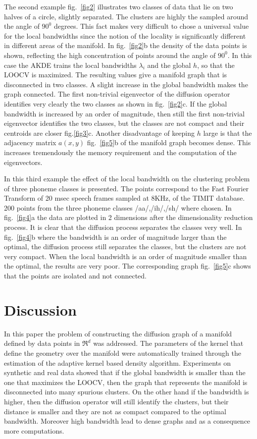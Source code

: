 \documentclass[12pt,letterpaper,doublespaced,ETD,dvips,proposal]{gtthesis}
\begin{document}
\begin{Body}
The second example fig.~\ref{fig2} illustrates two classes of data
that lie on two halves of a circle, slightly separated. The clusters
are highly the sampled around the angle  of $90^0$ degrees. This
fact makes very difficult to chose a universal value for the local
bandwidths since the notion of the locality is significantly
different in different areas of the manifold. In fig.~\ref{fig2}b
the  density of the data points is shown, reflecting the high
concentration of points around the angle of $90^0$. In this case the
AKDE trains the local bandwidths $\lambda_i$ and the global $h$, so
that the LOOCV is maximized. The resulting values give a manifold
graph that is disconnected in two classes. A  slight increase in the
global bandwidth makes the graph connected.  The first non-trivial
eigenvector of the diffusion operator identifies very clearly the
two classes as shown in fig.~\ref{fig2}c. If the global bandwidth is
increased by an order of magnitude, then still the first non-trivial
eigenvector identifies the two classes, but the classes are not
compact and their centroids are closer fig.\ref{fig3}c. Another
disadvantage of keeping $h$ large is that the adjacency matrix
$a(x,y)$ fig.~\ref{fig5}b of the manifold graph becomes dense. This
increases tremendously the memory requirement and the computation of
the eigenvectors.

In this third example the effect of the local bandwidth on the
clustering problem of three phoneme classes is presented. The points
correspond to the Fast Fourier Transform of 20 msec speech frames
sampled at 8KHz, of the TIMIT database. 200 points from the three
phoneme classes /aa/,/ih/,/sh/ where chosen. In fig.~\ref{fig4}a the
data are plotted in 2 dimensions after the dimensionality reduction
process. It is clear that the diffusion process separates the
classes very well. In fig.~\ref{fig4}b where the bandwidth is an
order of magnitude larger than the optimal, the diffusion process
still separates the  classes, but the clusters are not very compact.
When the local bandwidth is an order of magnitude smaller than the
optimal, the results are very poor. The corresponding graph
fig.~\ref{fig5}c shows that the points are isolated and not
connected.




\section{Discussion}
In this paper the problem of constructing the diffusion graph of a
manifold defined by data points in $\Re^d$ was addressed. The
parameters of the kernel that define the geometry over the manifold
were automatically trained through the estimation of the adaptive
kernel based density  algorithm. Experiments on synthetic and real
data showed that  if the global bandwidth is smaller than the one
that maximizes the LOOCV, then the graph that represents the
manifold is disconnected into  many spurious clusters. On the other
hand if the bandwidth is higher, then the diffusion operator will
still identify the clusters, but their distance is smaller and they
are not as compact compared to the optimal bandwidth. Moreover high
bandwidth lead to dense graphs and as a consequence more
computations.


\end{Body}
\end{document}
